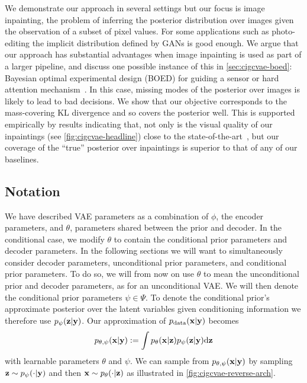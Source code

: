 We demonstrate our approach in several settings but our focus is image inpainting, the problem of inferring the posterior distribution over images given the observation of a subset of pixel values. For some applications such as photo-editing the implicit distribution defined by GANs is good enough. We argue that our approach has substantial advantages when
image inpainting is used as part of a larger pipeline, and discuss one possible
instance of this in \cref{sec:cigcvae-boed}: Bayesian optimal experimental design (BOED)
for guiding a sensor or hard attention
mechanism~\citep{ma2018eddi,harvey2019near,rangrej2021achieving}. In this case,
missing modes of the posterior over images is likely to lead to bad decisions.
We show that our objective corresponds to the mass-covering KL divergence and so
covers the posterior well. This is supported empirically by results indicating that, not only is the visual quality of our inpaintings (see \cref{fig:cigcvae-headline}) close to the
state-of-the-art~\citep{zhao2021large}, but our coverage of the ``true''
posterior over inpaintings is superior to that of any of our baselines.


\subsection{Notation}
We have described VAE parameters as a combination of $\phi$, the encoder parameters, and $\theta$, parameters shared between the prior and decoder. In the conditional case, we modify $\theta$ to contain the conditional prior parameters and decoder parameters. In the following sections we will want to simultaneously consider decoder parameters, unconditional prior parameters, and conditional prior parameters. To do so, we will from now on use $\theta$ to mean the unconditional prior and decoder parameters, as for an unconditional VAE. We will then denote the conditional prior parameters $\psi \in \Psi$.
To denote the conditional prior's approximate posterior over the latent variables given conditioning information we therefore use $p_\psi({\mathbf{z}}|{\mathbf{y}})$.
%
Our approximation of $p_{\rm{data}}({\mathbf{x}}|{\mathbf{y}})$ becomes
\begin{equation}
  \label{eq:marginal-image-posterior}
  p_{\theta,\psi}({\mathbf{x}}|{\mathbf{y}}) := \int p_\theta({\mathbf{x}}|{\mathbf{z}})p_\psi({\mathbf{z}}|{\mathbf{y}}) \mathrm{d}{\mathbf{z}}
\end{equation}
with learnable parameters $\theta$ and $\psi$. We can sample from
$p_{\theta,\psi}({\mathbf{x}}|{\mathbf{y}})$ by sampling ${\mathbf{z}}\sim p_\psi(\cdot|{\mathbf{y}})$ and then
${\mathbf{x}}\sim p_\theta(\cdot|{\mathbf{z}})$ as illustrated in \cref{fig:cigcvae-reverse-arch}. 
%

